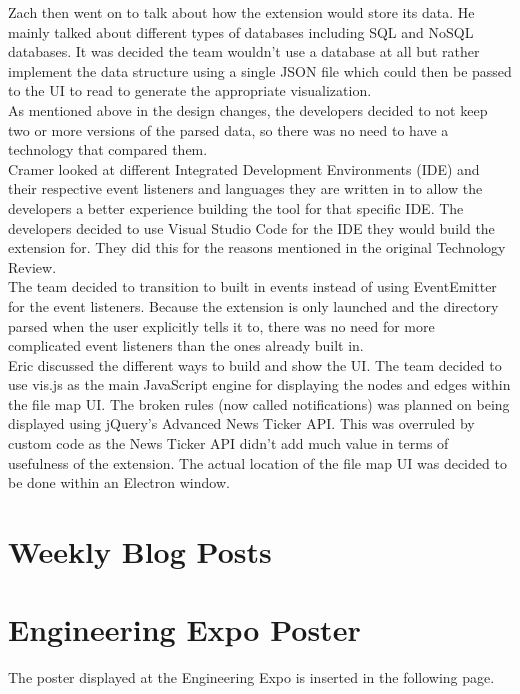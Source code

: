 \documentclass[letterpaper,10pt,titlepage,draftclsnofoot,onecolumn,onesided] {IEEEtran}
\begin{document}
Zach then went on to talk about how the extension would store its data.
He mainly talked about different types of databases including SQL and NoSQL databases.
It was decided the team wouldn't use a database at all but rather implement the data structure using a single JSON file which could then be passed to the UI to read to generate the appropriate visualization. \\

As mentioned above in the design changes, the developers decided to not keep two or more versions of the parsed data, so there was no need to have a technology that compared them. \\

Cramer looked at different Integrated Development Environments (IDE) and their respective event listeners and languages they are written in to allow the developers a better experience building the tool for that specific IDE.
The developers decided to use Visual Studio Code for the IDE they would build the extension for.
They did this for the reasons mentioned in the original Technology Review.\\

The team decided to transition to built in events instead of using EventEmitter for the event listeners.
Because the extension is only launched and the directory parsed when the user explicitly tells it to, there was no need for more complicated event listeners than the ones already built in. \\

Eric discussed the different ways to build and show the UI. 
The team decided to use vis.js as the main JavaScript engine for displaying the nodes and edges within the file map UI.
The broken rules (now called notifications) was planned on being displayed using jQuery's Advanced News Ticker API. 
This was overruled by custom code as the News Ticker API didn't add much value in terms of usefulness of the extension.
The actual location of the file map UI was decided to be done within an Electron window.\\

\section{Weekly Blog Posts}
		
		
	

\section{Engineering Expo Poster}
The poster displayed at the Engineering Expo is inserted in the following page.
\pagebreak
\end{document}
